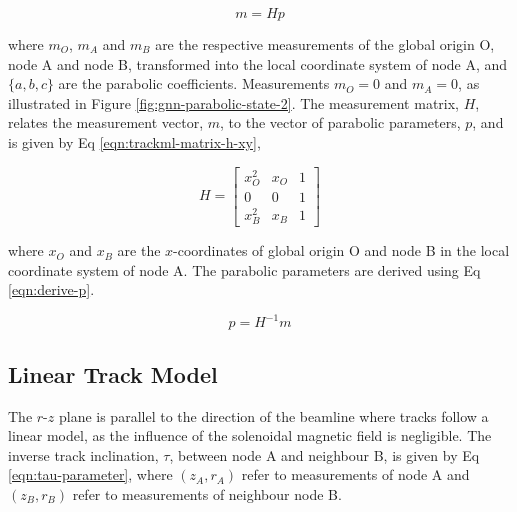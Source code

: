 \begin{equation}
    m = H p 
    \label{eqn:parabolic-equations}
\end{equation}

where $m_O$, $m_A$ and $m_B$ are the respective measurements of the global origin O, node A and node B, transformed into the local coordinate system of node A, and $\{a, b, c\}$ are the parabolic coefficients. Measurements $m_O = 0$ and $m_A = 0$, as illustrated in Figure \ref{fig:gnn-parabolic-state-2}. The measurement matrix, $H$, relates the measurement vector, $m$, to the vector of parabolic parameters, $p$, and is given by Eq \eqref{eqn:trackml-matrix-h-xy},

\begin{equation}
    H = \begin{bmatrix} x_O^{2} & x_O & 1 \\ 0 & 0 & 1 \\ x_B^{2} & x_B & 1 \end{bmatrix} 
    \label{eqn:trackml-matrix-h-xy}
\end{equation}

where $x_O$ and $x_B$ are the $x$-coordinates of global origin O and node B in the local coordinate system of node A. The parabolic parameters are derived using Eq \eqref{eqn:derive-p}.

\begin{equation}
    p = H^{-1} m 
    \label{eqn:derive-p}
\end{equation}




\subsection{Linear Track Model}
\label{linear-state}

The $r$-$z$ plane is parallel to the direction of the beamline where tracks follow a linear model, as the influence of the solenoidal magnetic field is negligible. The inverse track inclination, $\tau$, between node A and neighbour B, is given by Eq \eqref{eqn:tau-parameter}, where $(z_A, r_A)$ refer to measurements of node A and $(z_B, r_B)$ refer to measurements of neighbour node B.

